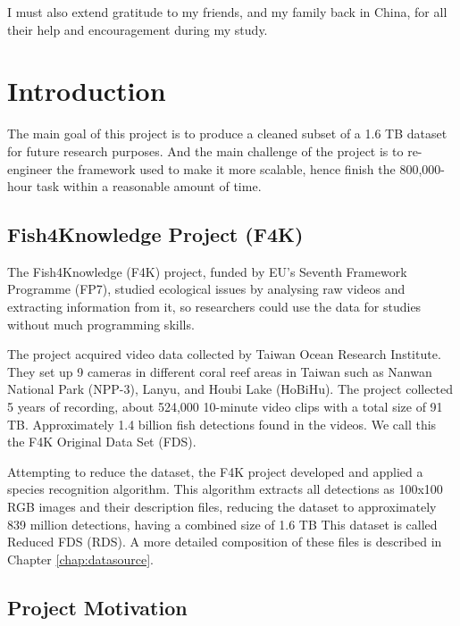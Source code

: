 \documentclass[bsc,logo,twoside,fullspacing,parskip]{infthesis}
\begin{document}
I must also extend gratitude to my friends, and my family back in China, for all their help and encouragement during my study.

\newpage

\standarddeclaration

\tableofcontents



\chapter{Introduction}


The main goal of this project is to produce a cleaned subset of a 1.6 TB dataset for future research purposes. And the main challenge of the project is to re-engineer the framework used to make it more scalable, hence finish the 800,000-hour task within a reasonable amount of time.

\section{Fish4Knowledge Project (F4K)}

The Fish4Knowledge (F4K) project, funded by EU's Seventh Framework Programme (FP7), studied ecological issues by analysing raw videos and extracting information from it, so researchers could use the data for studies without much programming skills. 

The project acquired video data collected by Taiwan Ocean Research Institute. 
They set up 9 cameras in different coral reef areas in Taiwan such as Nanwan National Park (NPP-3), Lanyu, and Houbi Lake (HoBiHu). 
The project collected 5 years of recording, about 524,000 10-minute video clips with a total size of 91 TB. Approximately 1.4 billion fish detections found in the videos. 
We call this the F4K Original Data Set (FDS). 

Attempting to reduce the dataset, the F4K project developed and applied a species recognition algorithm. 
This algorithm extracts all detections as 100x100 RGB images and their description files, reducing the dataset to approximately 839 million detections, having a combined size of 1.6 TB
This dataset is called Reduced FDS (RDS).
A more detailed composition of these files is described in Chapter \ref{chap:datasource}.

\section{Project Motivation}
\end{document}
